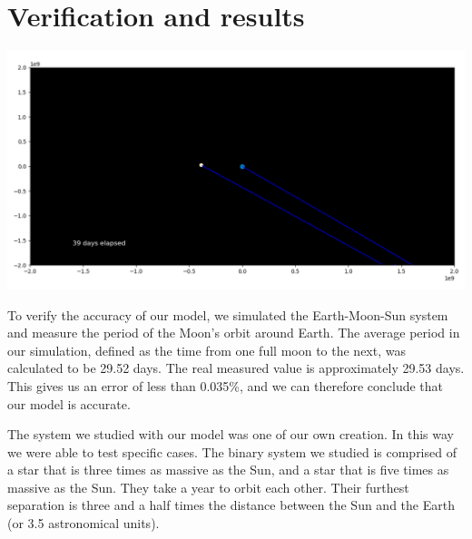 \documentclass[12pt]{article}
\begin{document}
\section{Verification and results}
\begin{center}
\includegraphics[width=\textwidth]{sem}
\end{center}
To verify the accuracy of our model, we simulated the Earth-Moon-Sun system and measure the period of the Moon's orbit around Earth. The average period in our simulation, defined as the time from one full moon to the next, was calculated to be 29.52 days. The real measured value is approximately 29.53 days. This gives us an error of less than 0.035\%, and we can therefore conclude that our model is accurate.

The system we studied with our model was one of our own creation. In this way we were able to test specific cases. The binary system we studied is comprised of a star
that is three times as massive as the Sun, and a star that is five times as massive as the Sun. They take a year to orbit each other. Their furthest separation is three and a half times the distance between the Sun and the Earth (or 3.5 astronomical units).\
\end{document}
